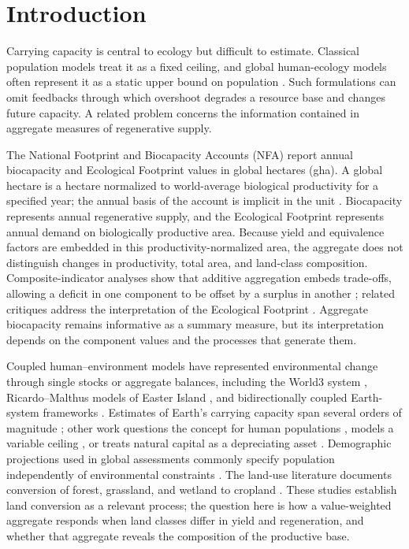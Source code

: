 \documentclass[preprint,12pt,authoryear]{elsarticle}
\begin{document}
\section{Introduction}\label{sec:intro}

Carrying capacity is central to ecology but difficult to estimate. Classical population models treat it as a fixed ceiling, and global human-ecology models often represent it as a static upper bound on population \citep{Cohen1995}. Such formulations can omit feedbacks through which overshoot degrades a resource base and changes future capacity. A related problem concerns the information contained in aggregate measures of regenerative supply.

The National Footprint and Biocapacity Accounts (NFA) report annual biocapacity and Ecological Footprint values in global hectares (gha). A global hectare is a hectare normalized to world-average biological productivity for a specified year; the annual basis of the account is implicit in the unit \citep{GFNStandards2009,GFNGuidebook2019}. Biocapacity represents annual regenerative supply, and the Ecological Footprint represents annual demand on biologically productive area. Because yield and equivalence factors are embedded in this productivity-normalized area, the aggregate does not distinguish changes in productivity, total area, and land-class composition. Composite-indicator analyses show that additive aggregation embeds trade-offs, allowing a deficit in one component to be offset by a surplus in another \citep{Nardo2008,Becker2017,Fischer2022}; related critiques address the interpretation of the Ecological Footprint \citep{Blomqvist2013,GiampietroSaltelli2014,vdBerghGrazi2015,Galli2016}. Aggregate biocapacity remains informative as a summary measure, but its interpretation depends on the component values and the processes that generate them.

Coupled human--environment models have represented environmental change through single stocks or aggregate balances, including the World3 system \citep{Meadows1972,Meadows1974,Meadows2004}, Ricardo--Malthus models of Easter Island \citep{BranderTaylor1998,Anderies2000}, and bidirectionally coupled Earth-system frameworks \citep{Motesharrei2016,Donges2017,CalvinBondLamberty2018,HendersonLoreau2018}. Estimates of Earth's carrying capacity span several orders of magnitude \citep{Cohen1995,vdBerghRietveld2004}; other work questions the concept for human populations \citep{Simon1996}, models a variable ceiling \citep{Meyer1994,MeyerAusubel1999}, or treats natural capital as a depreciating asset \citep{Dasgupta2021}. Demographic projections used in global assessments commonly specify population independently of environmental constraints \citep{UN2022}. The land-use literature documents conversion of forest, grassland, and wetland to cropland \citep{Haberl2007,Krausmann2013,Erb2017}. These studies establish land conversion as a relevant process; the question here is how a value-weighted aggregate responds when land classes differ in yield and regeneration, and whether that aggregate reveals the composition of the productive base.
\end{document}
